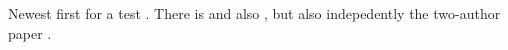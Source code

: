 \citet{narvaez2004}
\citet{young2004}
\citep{sorba2019}

Newest first for a test \citep{jia2016}. There is \citet{jia2012a} and also \citet{jia2012b}, but also indepedently the two-author paper \citet{jiaandkivelson2012}.
\citet{kivelson2014book}

\citep{carisma2018}

\citet{pilkington2015, pilkington2015b}